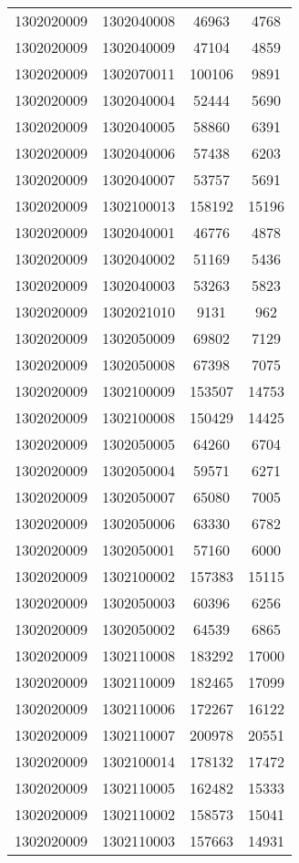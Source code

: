 \begin{longtable}[h]{llcc}
		1302020009 & 1302040008 & 46963 & 4768\\
		1302020009 & 1302040009 & 47104 & 4859\\
		1302020009 & 1302070011 & 100106 & 9891\\
		1302020009 & 1302040004 & 52444 & 5690\\
		1302020009 & 1302040005 & 58860 & 6391\\
		1302020009 & 1302040006 & 57438 & 6203\\
		1302020009 & 1302040007 & 53757 & 5691\\
		1302020009 & 1302100013 & 158192 & 15196\\
		1302020009 & 1302040001 & 46776 & 4878\\
		1302020009 & 1302040002 & 51169 & 5436\\
		1302020009 & 1302040003 & 53263 & 5823\\
		1302020009 & 1302021010 & 9131 & 962\\
		1302020009 & 1302050009 & 69802 & 7129\\
		1302020009 & 1302050008 & 67398 & 7075\\
		1302020009 & 1302100009 & 153507 & 14753\\
		1302020009 & 1302100008 & 150429 & 14425\\
		1302020009 & 1302050005 & 64260 & 6704\\
		1302020009 & 1302050004 & 59571 & 6271\\
		1302020009 & 1302050007 & 65080 & 7005\\
		1302020009 & 1302050006 & 63330 & 6782\\
		1302020009 & 1302050001 & 57160 & 6000\\
		1302020009 & 1302100002 & 157383 & 15115\\
		1302020009 & 1302050003 & 60396 & 6256\\
		1302020009 & 1302050002 & 64539 & 6865\\
		1302020009 & 1302110008 & 183292 & 17000\\
		1302020009 & 1302110009 & 182465 & 17099\\
		1302020009 & 1302110006 & 172267 & 16122\\
		1302020009 & 1302110007 & 200978 & 20551\\
		1302020009 & 1302100014 & 178132 & 17472\\
		1302020009 & 1302110005 & 162482 & 15333\\
		1302020009 & 1302110002 & 158573 & 15041\\
		1302020009 & 1302110003 & 157663 & 14931\\

\end{longtable}
